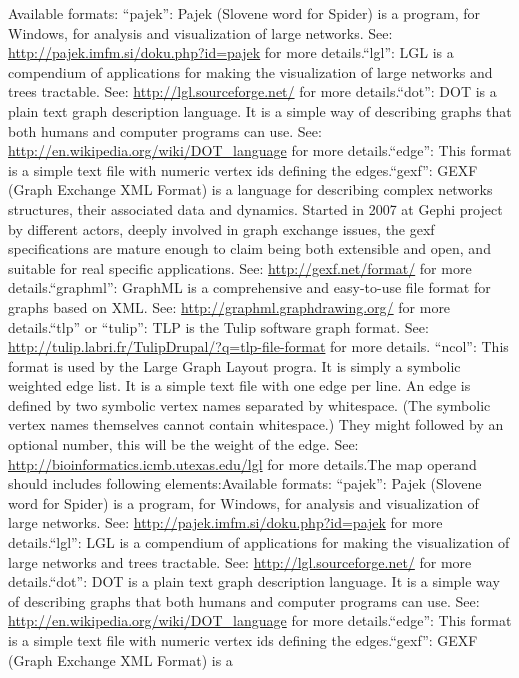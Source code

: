 \documentclass[]{book}
\theoremstyle{definition}
\theoremstyle{definition}
\theoremstyle{definition}
\theoremstyle{remark}
\begin{document}
Available formats: ``pajek'': Pajek (Slovene word for Spider) is a
program, for Windows, for analysis and visualization of large networks.
See: \url{http://pajek.imfm.si/doku.php?id=pajek} for more
details.``lgl'': LGL is a compendium of applications for making the
visualization of large networks and trees tractable. See:
\url{http://lgl.sourceforge.net/} for more details.``dot'': DOT is a
plain text graph description language. It is a simple way of describing
graphs that both humans and computer programs can use. See:
\url{http://en.wikipedia.org/wiki/DOT_language} for more
details.``edge'': This format is a simple text file with numeric vertex
ids defining the edges.``gexf'': GEXF (Graph Exchange XML Format) is a
language for describing complex networks structures, their associated
data and dynamics. Started in 2007 at Gephi project by different actors,
deeply involved in graph exchange issues, the gexf specifications are
mature enough to claim being both extensible and open, and suitable for
real specific applications. See: \url{http://gexf.net/format/} for more
details.``graphml'': GraphML is a comprehensive and easy-to-use file
format for graphs based on XML. See:
\url{http://graphml.graphdrawing.org/} for more details.``tlp'' or
``tulip'': TLP is the Tulip software graph format. See:
\url{http://tulip.labri.fr/TulipDrupal/?q=tlp-file-format} for more
details. ``ncol'': This format is used by the Large Graph Layout progra.
It is simply a symbolic weighted edge list. It is a simple text file
with one edge per line. An edge is defined by two symbolic vertex names
separated by whitespace. (The symbolic vertex names themselves cannot
contain whitespace.) They might followed by an optional number, this
will be the weight of the edge. See:
\url{http://bioinformatics.icmb.utexas.edu/lgl} for more details.The map
operand should includes following elements:Available formats: ``pajek'':
Pajek (Slovene word for Spider) is a program, for Windows, for analysis
and visualization of large networks. See:
\url{http://pajek.imfm.si/doku.php?id=pajek} for more details.``lgl'':
LGL is a compendium of applications for making the visualization of
large networks and trees tractable. See:
\url{http://lgl.sourceforge.net/} for more details.``dot'': DOT is a
plain text graph description language. It is a simple way of describing
graphs that both humans and computer programs can use. See:
\url{http://en.wikipedia.org/wiki/DOT_language} for more
details.``edge'': This format is a simple text file with numeric vertex
ids defining the edges.``gexf'': GEXF (Graph Exchange XML Format) is a
\end{document}
